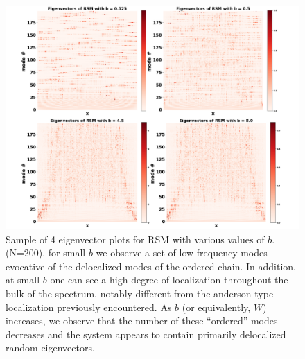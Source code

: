 \documentclass{article}
\begin{document}
\begin{figure}
\begin{center}
	\includegraphics[width=\textwidth]{Figures/RSM_eigenvectors.png}
\end{center}
\caption{Sample of 4 eigenvector plots for RSM with various values of $b$. 
(N=200). for small $b$ we observe a set of low frequency modes evocative of the delocalized modes of the ordered chain. 
In addition, at small $b$ one can see a high degree of localization throughout the bulk of the spectrum, notably different from the
anderson-type localization previously encountered.
As $b$ (or equivalently, $W$) increases, we observe that the number of these ``ordered'' modes decreases and the system appears to contain
primarily delocalized random eigenvectors.}
\label{fig:finite_bandwidth_sample}
\end{figure}
\end{document}
